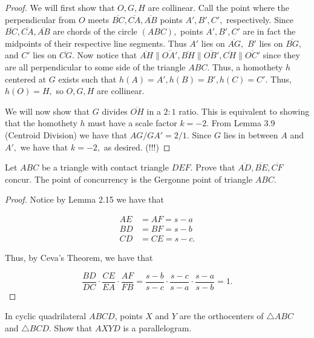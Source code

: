 \documentclass[letterpaper,oneside]{scrartcl}
\begin{document}
\begin{proof}  We will first show that $O,G,H$ are collinear. Call the point where the perpendicular from $O$ meets $\overline{BC},\overline{CA}, \overline{AB}$ points $A',B',C',$ respectively. Since $\overline{BC},\overline{CA}, \overline{AB}$ are chords of the circle $(ABC),$ points $A',B',C'$ are in fact the midpoints of their respective line segments. Thus $A'$ lies on $\overline{AG},$ $B'$ lies on $\overline{BG},$ and $C'$ lies on $\overline{CG}.$ Now notice that $\overline{AH} \parallel \overline{OA'}, \overline{BH} \parallel \overline{OB'}, \overline{CH} \parallel \overline{OC'}$ since they are all perpendicular to some side of the triangle $ABC.$  Thus, a homothety $h$ centered at $G$ exists such that $h(A) = A', h(B) = B', h(C) = C'.$ Thus, $h(O) = H,$ so $O,G,H$ are collinear.

  We will now show that $G$ divides $\overline{OH}$ in a $2:1$ ratio. This is equivalent to showing that the homothety $h$ must have a scale factor $k = -2.$ From Lemma 3.9 (Centroid Division) we have that $AG/GA' = 2/1.$ Since $G$ lies in between $A$ and $A',$ we have that $k=-2,$ as desired. (!!!) \end{proof}



\begin{problem*}
  [3.16]
  Let $ABC$ be a triangle with contact triangle $DEF$. Prove that $\overline{AD}, \overline{BE}, \overline{CF}$ concur. The point of concurrency is the Gergonne point of triangle $ABC$.
\end{problem*}

\begin{proof}
  Notice by Lemma 2.15 we have that

  \begin{align*}
    AE & = AF = s-a  \\
    BD & = BF = s-b  \\
    CD & = CE = s-c.
  \end{align*}

  Thus, by Ceva's Theorem, we have that

  $$\frac{BD}{DC}\cdot\frac{CE}{EA}\cdot\frac{AF}{FB} = \frac{s-b}{s-c}\cdot\frac{s-c}{s-a}\cdot\frac{s-a}{s-b} =1.$$
\end{proof}



\begin{lemma*}
  [3.17]
  In cyclic quadrilateral $ABCD$, points $X$ and $Y$ are the orthocenters of $\triangle ABC$ and $\triangle BCD.$ Show that  $AXYD$ is a parallelogram.
\end{lemma*}
\end{document}

